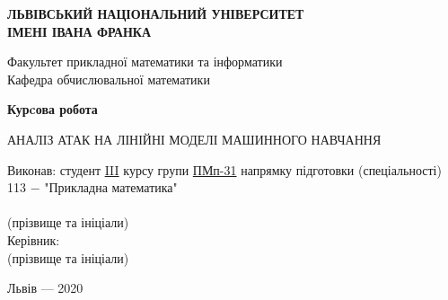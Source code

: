\documentclass[a4paper,12pt]{extreport}
\begin{document}
	\begin{titlepage}%
    	\begin{center}
	    	\large{\textbf{ЛЬВІВСЬКИЙ НАЦІОНАЛЬНИЙ УНІВЕРСИТЕТ \\ ІМЕНІ ІВАНА ФРАНКА}}\par
	       	{Факультет прикладної математики та інформатики\\ Кафедра обчислювальної математики}\par
			\begin{center}
	
	        \end{center}
	        \vspace{25mm}
	        \textbf{\Huge{Курcова робота}}\par
	        \vspace{5mm}
	        {\large{АНАЛІЗ АТАК НА ЛІНІЙНІ МОДЕЛІ МАШИННОГО НАВЧАННЯ}}\par
	        \vspace{5mm}
	        {}\par %
        \end{center}
	   	
	   	\vspace{30mm}
	   	
		\begin{flushright}
   	   		\begin{minipage}[t]{100mm}
   	   			\flushleft
   	   			\large{
	   	   		Виконав: студент \underline{III} курсу групи \underline{ПМп-31} напрямку підготовки (спеціальності) \\
	   	   		113 $-$ "Прикладна математика" \hfill \\
				}
	   	   	   	\large{	   	   	   			   	   		\noindent\underline{} \\
   	   			}
      			\small{
	   	   		\hfill \footnotesize{(прізвище та ініціали)} \\
	   	   		}
	   	   		\large{
	   	   			Керівник: \noindent\underline{}
   	   			} \\
	   	   		\small{
	   	   		\hfill \footnotesize{(прізвище та ініціали)} \\
	   	   		\vspace{2ex}
				}
   	   		\end{minipage}
   	   \end{flushright}
	   \vfill
   	   
   	   \begin{center}Львів --- 2020\end{center}
    \end{titlepage}
	
\end{document}
